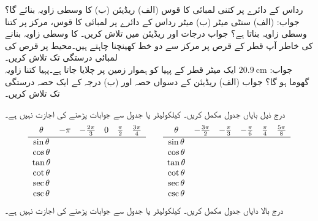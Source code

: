رداس  کے دائرے پر کتنی لمبائی کا قوس  (الف)  ریڈیئن (ب)  کا وسطی زاویہ بنائے گا؟\\
جواب:\quad
(الف)  سنٹی میٹر  (ب)  میٹر
رداس  کے دائرے پر  لمبائی کا قوس، مرکز پر کتنا وسطی زاویہ بناتا ہے؟ جواب درجات اور ریڈیئن میں تلاش کریں۔ 
\quad
{} کا وسطی زاویہ بنانے  کی خاطر  آپ  قطر کے قرص پر مرکز سے  دو خط کھینچنا چاہتے ہیں۔محیط پر قرص کی لمبائی  درستگی تک تلاش کریں۔\\
جواب:\quad
$\SI{20.9}{\centi\meter}$  
\quad
ایک میٹر قطر کے پہیا کو ہموار زمین پر چلایا جاتا ہے۔پہیا کتنا زاویہ گھوما ہو گا؟ جواب (الف) ریڈیئن کے دسواں حصہ اور (ب) درجہ کے ایک حصہ درستگی تک تلاش کریں۔

درج ذیل بایاں جدول مکمل کریں۔ کیلکولیٹر یا جدول سے جوابات پڑھنے کی اجازت نہیں ہے۔
\begin{align*}
\begin{array}{cccccc}
\theta&-\pi&-\tfrac{2\pi}{3}&0&\tfrac{\pi}{2}&\tfrac{3\pi}{4}\Bstrut\\ 
\hline
\sin \theta\\
\cos \theta\\
\tan \theta\\
\cot \theta\\
\sec\theta\\
\csc\theta
\end{array}\quad\quad
\begin{array}{cccccc}
\theta&-\tfrac{3\pi}{2}&-\tfrac{\pi}{3}&-\tfrac{\pi}{6}&\tfrac{\pi}{4}&\tfrac{5\pi}{8}\Bstrut\\ 
\hline
\sin \theta\\
\cos \theta\\
\tan \theta\\
\cot \theta\\
\sec\theta\\
\csc\theta
\end{array}
\end{align*}
درج بالا دایاں جدول مکمل کریں۔ کیلکولیٹر یا جدول سے جوابات پڑھنے کی اجازت نہیں ہے۔

